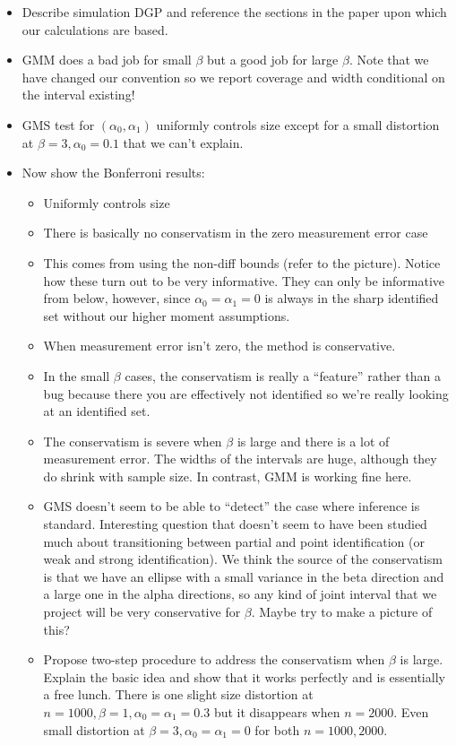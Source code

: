 \begin{itemize}
  \item Describe simulation DGP and reference the sections in the paper upon which our calculations are based.
  \item GMM does a bad job for small $\beta$ but a good job for large $\beta$.
    Note that we have changed our convention so we report coverage and width conditional on the interval existing!
  \item GMS test for $(\alpha_0, \alpha_1)$ uniformly controls size except for a small distortion at $\beta=3,\alpha_0=0.1$ that we can't explain.
  \item Now show the Bonferroni results:
    \begin{itemize}
      \item Uniformly controls size
      \item There is basically no conservatism in the zero measurement error case
      \item This comes from using the non-diff bounds (refer to the picture). Notice how these turn out to be very informative. They can only be informative from below, however, since $\alpha_0 = \alpha_1 = 0$ is always in the sharp identified set without our higher moment assumptions.
      \item When measurement error isn't zero, the method is conservative. 
      \item In the small $\beta$ cases, the conservatism is really a ``feature'' rather than a bug because there you are effectively not identified so we're really looking at an identified set.
      \item The conservatism is severe when $\beta$ is large and there is a lot of measurement error.
        The widths of the intervals are huge, although they do shrink with sample size.
        In contrast, GMM is working fine here.
      \item GMS doesn't seem to be able to ``detect'' the case where inference is standard. 
        Interesting question that doesn't seem to have been studied much about transitioning between partial and point identification (or weak and strong identification).
        We think the source of the conservatism is that we have an ellipse with a small variance in the beta direction and a large one in the alpha directions, so any kind of joint interval that we project will be very conservative for $\beta$. Maybe try to make a picture of this?
      \item Propose two-step procedure to address the conservatism when $\beta$ is large. 
        Explain the basic idea and show that it works perfectly and is essentially a free lunch. 
        There is one slight size distortion at $n = 1000,\beta = 1, \alpha_0 = \alpha_1 = 0.3$ but it disappears when $n = 2000$. Even small distortion at $\beta = 3, \alpha_0 = \alpha_1 = 0$ for both $n =1000, 2000$.
    \end{itemize}
\end{itemize}
